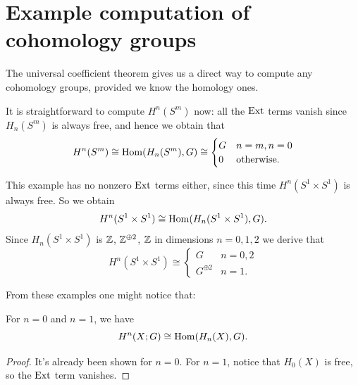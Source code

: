 \section{Example computation of cohomology groups}

The universal coefficient theorem gives us a direct way to compute
any cohomology groups, provided we know the homology ones.

\begin{example}
	It is straightforward to compute $H^n(S^m)$ now:
	all the $\operatorname{Ext}$ terms vanish since $H_n(S^m)$ is always free,
	and hence we obtain that
	\[ H^n(S^m) \cong \operatorname{Hom}(H_n(S^m), G) \cong
		\begin{cases}
			G & n=m, n=0 \\
			0 & \text{otherwise}.
		\end{cases}
	\]
\end{example}

\begin{example}
	This example has no nonzero $\operatorname{Ext}$ terms either,
	since this time $H^n(S^1 \times S^1)$ is always free.
	So we obtain
	\[ H^n(S^1 \times S^1) \cong \operatorname{Hom}(H_n(S^1 \times S^1), G). \]
	Since $H_n(S^1 \times S^1)$ is $\mathbb Z$, $\mathbb Z^{\oplus 2}$, $\mathbb Z$
	in dimensions $n=0,1,2$ we derive that
	\[
		H^n(S^1 \times S^1)
		\cong
		\begin{cases}
			G & n = 0,2 \\
			G^{\oplus 2} & n = 1.
		\end{cases}
	\]
\end{example}

From these examples one might notice that:
\begin{lemma}
	For $n = 0$ and $n = 1$, we have
	\[ H^n(X;G) \cong \operatorname{Hom}(H_n(X), G). \]
\end{lemma}
\begin{proof}
	It's already been shown for $n=0$.
	For $n=1$, notice that $H_0(X)$ is free,
	so the $\operatorname{Ext}$ term vanishes.
\end{proof}

